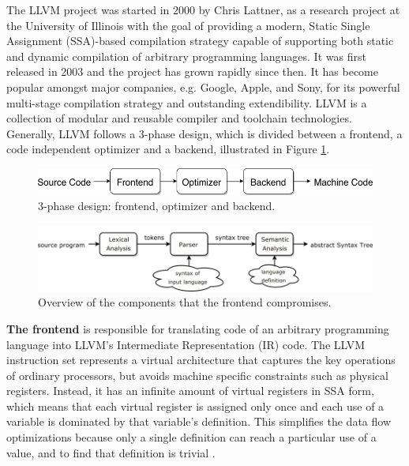 
The LLVM project was started in 2000 by Chris Lattner, as a research project at the University of Illinois with the goal of providing a modern, Static Single Assignment (SSA)-based compilation strategy capable of supporting both static and dynamic compilation of arbitrary programming languages. It was first released in 2003 and the project has grown rapidly since then. It has become popular amongst major companies, e.g. Google, Apple, and Sony, for its powerful multi-stage compilation strategy and outstanding extendibility. LLVM is a collection of modular and reusable compiler and toolchain technologies. Generally, LLVM follows a 3-phase design, which is divided between a frontend, a code independent optimizer and a backend, illustrated in Figure \ref{fig:3phase_design}.

\begin{figure}[H]
\centering
\includegraphics[width=.75\textwidth]{figures/3phase_design}
\caption{3-phase design: frontend, optimizer and backend.}
\label{fig:3phase_design}
\end{figure}


\begin{figure}[t!]
\centering
\includegraphics[width=\textwidth]{figures/frontend}
\caption{Overview of the components that the frontend compromises.}
\label{fig:frontend}
\end{figure}

\textbf{The frontend} is responsible for translating code of an arbitrary programming language into LLVM's Intermediate Representation (IR) code. The LLVM instruction set represents a virtual architecture that captures the key operations of ordinary processors, but avoids machine specific constraints such as physical registers. Instead, it has an infinite amount of virtual registers in SSA form, which means that each virtual register is assigned only once and each use of a variable is dominated by that variable's definition. This simplifies the data flow optimizations because only a single definition can reach a particular use of a value, and to find that definition is trivial \cite{llvm_strategy}.

